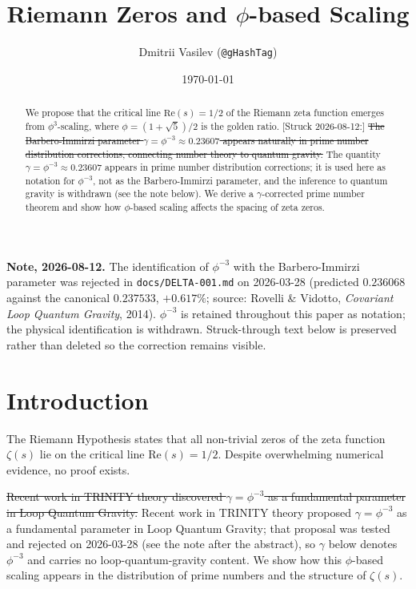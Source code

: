 \documentclass[12pt,a4paper]{article}
\title{Riemann Zeros and $\phi$-based Scaling}
\author{Dmitrii Vasilev (\texttt{@gHashTag})}
\date{\today}
\begin{document}
\maketitle

\begin{abstract}
We propose that the critical line $\text{Re}(s) = 1/2$ of the Riemann zeta function emerges from $\phi^3$-scaling, where $\phi = (1+\sqrt{5})/2$ is the golden ratio. [Struck 2026-08-12:] \sout{The Barbero-Immirzi parameter $\gamma = \phi^{-3} \approx 0.23607$ appears naturally in prime number distribution corrections, connecting number theory to quantum gravity.} The quantity $\gamma = \phi^{-3} \approx 0.23607$ appears in prime number distribution corrections; it is used here as notation for $\phi^{-3}$, not as the Barbero-Immirzi parameter, and the inference to quantum gravity is withdrawn (see the note below). We derive a $\gamma$-corrected prime number theorem and show how $\phi$-based scaling affects the spacing of zeta zeros.
\end{abstract}

\bigskip
\noindent\textbf{Note, 2026-08-12.} The identification of $\phi^{-3}$ with the Barbero-Immirzi parameter was rejected in \texttt{docs/DELTA-001.md} on 2026-03-28 (predicted $0.236068$ against the canonical $0.237533$, $+0.617\%$; source: Rovelli \& Vidotto, \emph{Covariant Loop Quantum Gravity}, 2014). $\phi^{-3}$ is retained throughout this paper as notation; the physical identification is withdrawn. Struck-through text below is preserved rather than deleted so the correction remains visible.

\section{Introduction}

The Riemann Hypothesis states that all non-trivial zeros of the zeta function $\zeta(s)$ lie on the critical line $\text{Re}(s) = 1/2$. Despite overwhelming numerical evidence, no proof exists.

\sout{Recent work in TRINITY theory discovered $\gamma = \phi^{-3}$ as a fundamental parameter in Loop Quantum Gravity.} Recent work in TRINITY theory proposed $\gamma = \phi^{-3}$ as a fundamental parameter in Loop Quantum Gravity; that proposal was tested and rejected on 2026-03-28 (see the note after the abstract), so $\gamma$ below denotes $\phi^{-3}$ and carries no loop-quantum-gravity content. We show how this $\phi$-based scaling appears in the distribution of prime numbers and the structure of $\zeta(s)$.
\end{document}

